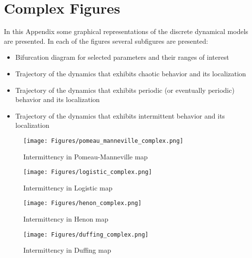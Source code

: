 \chapter{Complex Figures}
\label{sec:Appendix_complex_figures}
In this Appendix some graphical representations of the discrete dynamical models are presented.
In each of the figures several subfigures are presented:
\begin{itemize}
  \item Bifurcation diagram for selected parameters and their ranges of interest
  \item Trajectory of the dynamics that exhibits chaotic behavior and its localization
  \item Trajectory of the dynamics that exhibits periodic (or eventually periodic) behavior and its localization
  \item Trajectory of the dynamics that exhibits intermittent behavior and its localization
\end{itemize}

\begin{figure}[!ht]
	\centering
	\texttt{[image: Figures/pomeau\_manneville\_complex.png]}
	\caption{Intermittency in Pomeau-Manneville map}
	\label{fig:complex_pomeau_manneville}
\end{figure}

\begin{figure}[!ht]
	\centering
	\texttt{[image: Figures/logistic\_complex.png]}
	\caption{Intermittency in Logistic map}
	\label{fig:complex_logistic}
\end{figure}

\begin{figure}[!ht]
	\centering
	\texttt{[image: Figures/henon\_complex.png]}
	\caption{Intermittency in Henon map}
	\label{fig:complex_henon}
\end{figure}

\begin{figure}[!ht]
	\centering
	\texttt{[image: Figures/duffing\_complex.png]}
	\caption{Intermittency in Duffing map}
	\label{fig:complex_duffing}
\end{figure}

\endinput